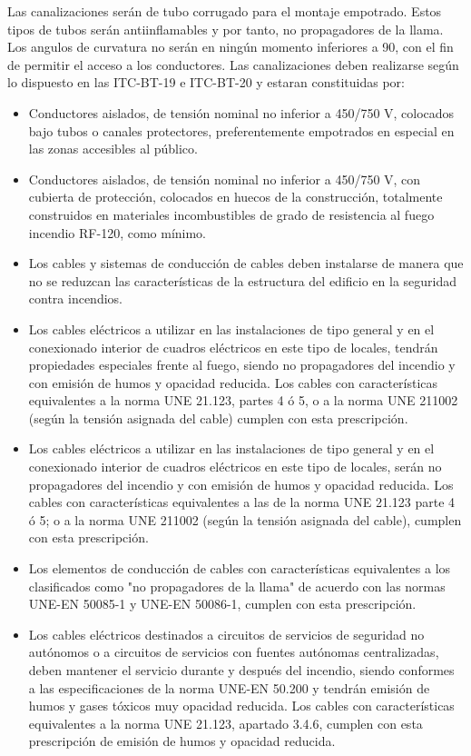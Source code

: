Las canalizaciones serán de tubo corrugado para el montaje empotrado. Estos tipos de tubos serán antiinflamables y por tanto, no propagadores de la llama. Los angulos de curvatura no serán en ningún momento inferiores a 90, con el fin de permitir el acceso a los conductores. Las canalizaciones deben realizarse según lo dispuesto en las ITC-BT-19 e ITC-BT-20 y estaran constituidas por:

\begin{itemize}
\item Conductores aislados, de tensión nominal no inferior a 450/750 V, colocados bajo tubos o canales protectores, preferentemente empotrados en especial en las zonas accesibles al público.

\item Conductores aislados, de tensión nominal no inferior a 450/750 V, con cubierta de protección, colocados en huecos de la construcción, totalmente construidos en materiales incombustibles de grado de resistencia al fuego incendio RF-120, como mínimo.

\item Los cables y sistemas de conducción de cables deben instalarse de manera que no se reduzcan las características de la estructura del edificio en la seguridad contra incendios.

\item Los cables eléctricos a utilizar en las instalaciones de tipo general y en el conexionado interior de cuadros eléctricos en este tipo de locales, tendrán propiedades especiales frente al fuego, siendo no propagadores del incendio y con emisión de humos y opacidad reducida. Los cables con características equivalentes a la norma UNE 21.123, partes 4 ó 5, o a la norma UNE 211002 (según la tensión asignada del cable) cumplen con esta prescripción.

\item Los cables eléctricos a utilizar en las instalaciones de tipo general y en el conexionado interior de cuadros eléctricos en este tipo de locales, serán no propagadores del incendio y con emisión de humos y opacidad reducida. Los cables con características equivalentes a las de la norma UNE 21.123 parte 4 ó 5; o a la norma UNE 211002 (según la tensión asignada del cable), cumplen con esta prescripción.

\item Los elementos de conducción de cables con características equivalentes a los clasificados como "no propagadores de la llama" de acuerdo con las normas UNE-EN 50085-1 y UNE-EN 50086-1, cumplen con esta prescripción.

\item Los cables eléctricos destinados a circuitos de servicios de seguridad no autónomos o a circuitos de servicios con fuentes autónomas centralizadas, deben mantener el servicio durante y después del incendio, siendo conformes a las especificaciones de la norma UNE-EN 50.200 y tendrán emisión de humos y gases tóxicos muy opacidad reducida. Los cables con características equivalentes a la norma UNE 21.123, apartado 3.4.6, cumplen con esta prescripción de emisión de humos y opacidad reducida.

\end{itemize}

